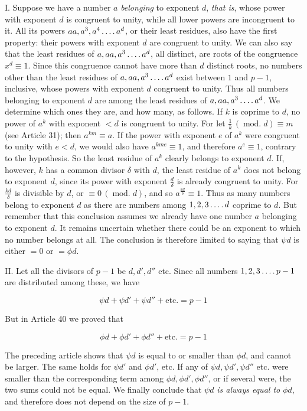 I. Suppose we have a number $a$ \emph{belonging} to exponent $d$, \emph{that is}, whose power with exponent $d$ is congruent to unity, while all lower powers are incongruent to it. All its powers $aa,a^3,a^4\mathinner{\ldotp\ldotp\ldotp\ldotp} a^d$, or their least residues, also have the first property: their powers with exponent $d$ are congruent to unity. We can also say that the least residues of $a,aa,a^3\mathinner{\ldotp\ldotp\ldotp\ldotp} a^d$, all distinct, are roots of the congruence $x^d\equiv1$. Since this congruence cannot have more than $d$ distinct roots, no numbers other than the least residues of $a,aa,a^3\mathinner{\ldotp\ldotp\ldotp\ldotp} a^d$ exist between $1$ and $p-1$, inclusive, whose powers with exponent $d$ congruent to unity. Thus all numbers belonging to exponent $d$ are among the least residues of $a,aa,a^3\mathinner{\ldotp\ldotp\ldotp\ldotp} a^d$. We determine which ones they are, and how many, as follows. If $k$ is coprime to $d$, no power of $a^k$ with exponent $<d$ is congruent to unity. For let $\frac{1}{k}\,(\operatorname{mod.}d)\equiv m$ (see Article 31); then $a^{km}\equiv a$. If the power with exponent $e$ of $a^k$ were congruent to unity with $e<d$, we would also have $a^{kme}\equiv1$, and therefore $a^e\equiv1$, contrary to the hypothesis. So the least residue of $a^k$ clearly belongs to exponent $d$. If, however, $k$ has a common divisor $\delta$ with $d$, the least residue of $a^k$ does not belong to exponent $d$, since its power with exponent ${\frac{d}{\delta}}$ is already congruent to unity. For $\frac{kd}{\delta}$ is divisible by $d$, or $\equiv0\,(\operatorname{mod.}d)$, and so $a^{\frac{kd}{\delta}}\equiv1$. Thus as many numbers belong to exponent $d$ as there are numbers among $1,2,3\mathinner{\ldotp\ldotp\ldotp\ldotp} d$ coprime to $d$. But remember that this conclusion assumes we already have one number $a$ belonging to exponent $d$. It remains uncertain whether there could be an exponent to which no number belongs at all. The conclusion is therefore limited to saying that $\psi d$ is either $=0$ or $=\phi d$.


II. Let all the divisors of $p-1$ be $d,d',d''$ etc. Since all numbers $1,2,3\mathinner{\ldotp\ldotp\ldotp\ldotp} p-1$ are distributed among these, we have

\[\psi d+\psi d'+\psi d''+\text{etc.}=p-1\]

But in Article 40 we proved that

\[\phi d+\phi d'+\phi d''+\text{etc.}=p-1\]

The preceding article shows that $\psi d$ is equal to or smaller than $\phi d$, and cannot be larger. The same holds for $\psi d'$ and $\phi d'$, etc. If any of $\psi d,\psi d',\psi d''$ etc. were smaller than the corresponding term among $\phi d,\phi d',\phi d''$, or if several were, the two sums could not be equal. We finally conclude that $\psi d$ \emph{is always equal to $\phi d$}, and therefore does not depend on the size of $p-1$.

